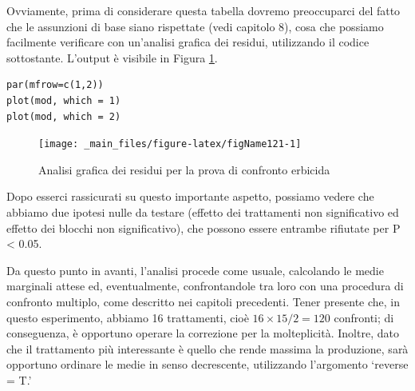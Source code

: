 \documentclass[a4paper,12pt,oneside]{book}
\begin{document}
Ovviamente, prima di considerare questa tabella dovremo preoccuparci del fatto che le assunzioni di base siano rispettate (vedi capitolo 8), cosa che possiamo facilmente verificare con un'analisi grafica dei residui, utilizzando il codice sottostante. L'output è visibile in Figura \ref{fig:figName121}.

\begin{verbatim}
par(mfrow=c(1,2))
plot(mod, which = 1)
plot(mod, which = 2)
\end{verbatim}

\begin{figure}

{\centering \texttt{[image: \_main\_files/figure-latex/figName121-1]} 

}

\caption{Analisi grafica dei residui per la prova di confronto erbicida}\label{fig:figName121}
\end{figure}

Dopo esserci rassicurati su questo importante aspetto, possiamo vedere che abbiamo due ipotesi nulle da testare (effetto dei trattamenti non significativo ed effetto dei blocchi non significativo), che possono essere entrambe rifiutate per P \textless{} 0.05.

Da questo punto in avanti, l'analisi procede come usuale, calcolando le medie marginali attese ed, eventualmente, confrontandole tra loro con una procedura di confronto multiplo, come descritto nei capitoli precedenti. Tener presente che, in questo esperimento, abbiamo 16 trattamenti, cioè \(16 \times 15 / 2 = 120\) confronti; di conseguenza, è opportuno operare la correzione per la molteplicità. Inoltre, dato che il trattamento più interessante è quello che rende massima la produzione, sarà opportuno ordinare le medie in senso decrescente, utilizzando l'argomento `reverse = T.'

\scriptsize
\end{document}
